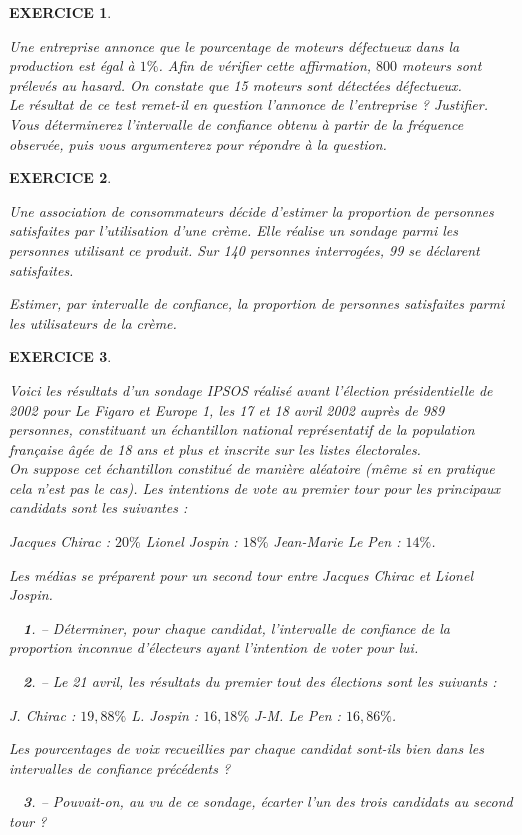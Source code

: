 \documentclass[a4paper]{article}   %
\renewcommand{\(}{\left(}
\renewcommand{\)}{\right)}
\newtheorem{ques}{~}
\newenvironment{qu}{\begin{ques}--} {\end{ques}}
\newtheorem{EXO}{\large EXERCICE }
\newenvironment{EX}   { \setcounter{ques}{0} \begin{EXO} \hrulefill ~\vspace{0.3cm}

\normalfont}    {\end{EXO} \medskip}
\begin{document}
\begin{EX}Une entreprise annonce que le pourcentage de moteurs défectueux dans la production est égal à $1\%$. Afin de vérifier cette affirmation, $800$ moteurs sont prélevés au hasard. On constate que 15 moteurs sont détectées défectueux.\\

Le résultat de ce test remet-il en question l'annonce de l'entreprise ? Justifier.\\
\textit{Vous déterminerez l'intervalle de confiance obtenu à partir de la fréquence observée, puis vous argumenterez pour répondre à la question.}
\end{EX}

\begin{EX}
Une association de consommateurs décide d’estimer la proportion de personnes satisfaites par l’utilisation d’une crème. Elle réalise un sondage parmi les personnes utilisant ce produit. Sur 140 personnes interrogées, 99 se déclarent satisfaites.

Estimer, par intervalle de confiance, la proportion de personnes satisfaites parmi les utilisateurs de la crème.
\end{EX}

\begin{EX}
Voici les résultats d’un sondage IPSOS réalisé avant l’élection présidentielle de
2002 pour Le Figaro et Europe 1, les 17 et 18 avril 2002 auprès de 989 personnes,
constituant un échantillon national représentatif de la population française âgée
de 18 ans et plus et inscrite sur les listes électorales. \\
On suppose cet échantillon constitué de manière aléatoire (même si en pratique
cela n’est pas le cas). Les intentions de vote au premier tour pour les principaux
candidats sont les suivantes : 
\begin{center}
Jacques Chirac : $20 \%$ \hspace{2cm} Lionel Jospin : $18 \%$  \hspace{2cm}  Jean-Marie Le Pen : $14 \%$.
\end{center}
Les médias se préparent pour un second tour entre Jacques Chirac et Lionel Jospin.
\begin{qu} Déterminer, pour chaque candidat, l'intervalle de confiance de la proportion inconnue d'électeurs ayant l'intention de voter pour lui.
\end{qu}
\begin{qu} Le 21 avril, les résultats du premier tout des élections sont les suivants :
\begin{center}
J. Chirac : $19,88 \%$ \hspace{2cm} L. Jospin : $16,18 \%$  \hspace{2cm}  J-M. Le Pen : $16,86 \%$.
\end{center}
Les pourcentages de voix recueillies par chaque candidat sont-ils bien dans les intervalles de confiance précédents ?
\end{qu}
\begin{qu} Pouvait-on, au vu de ce sondage, écarter l'un des trois candidats au second tour ?
\end{qu}
\end{EX}
\end{document}
